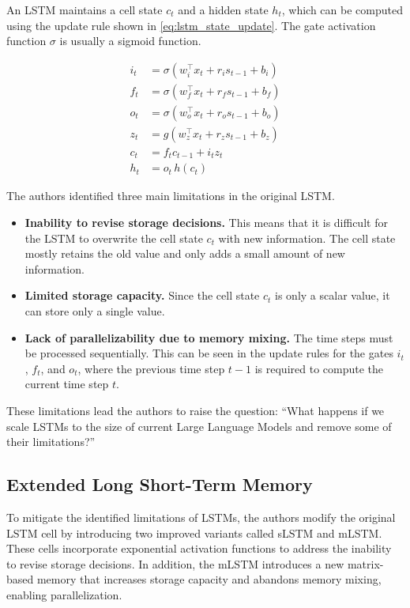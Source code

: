 \documentclass[a4paper,oneside,10pt,ngerman,english]{scrartcl}
\begin{document}
An LSTM maintains a cell state $c_t$ and a hidden state $h_t$, which can be computed using the update rule shown in \autoref{eq:lstm_state_update}. The gate activation function $\sigma$ is usually a sigmoid function.

\begin{align}
	i_t &= \sigma \left( w_i^{\top} x_t + r_i s_{t-1} + b_i \right) \\
	f_t &= \sigma \left( w_f^{\top} x_t + r_f s_{t-1} + b_f \right) \\
	o_t &= \sigma \left( w_o^{\top} x_t + r_o s_{t-1} + b_o \right) \\
	z_t &= g \left( w_z^{\top} x_t + r_z s_{t-1} + b_z \right) \\
	c_t &= f_t c_{t-1} + i_t z_t \\
	h_t &= o_t \, h(c_t)
	\label{eq:lstm_state_update}
\end{align}

The authors identified three main limitations in the original LSTM.
\begin{itemize}
	\item \textbf{Inability to revise storage decisions.} This means that it is difficult for the LSTM to overwrite the cell state $c_t$ with new information. The cell state mostly retains the old value and only adds a small amount of new information.
	\item \textbf{Limited storage capacity.} Since the cell state $c_t$ is only a scalar value, it can store only a single value.
	\item \textbf{Lack of parallelizability due to memory mixing.} The time steps must be processed sequentially. This can be seen in the update rules for the gates $i_t$, $f_t$, and $o_t$, where the previous time step $t-1$ is required to compute the current time step $t$.
\end{itemize}

These limitations lead the authors to raise the question: “What happens if we scale LSTMs to the size of current Large Language Models and remove some of their limitations?”

\subsection{Extended Long Short-Term Memory}
\label{sec:xlstm}

To mitigate the identified limitations of LSTMs, the authors modify the original LSTM cell by introducing two improved variants called sLSTM and mLSTM. These cells incorporate exponential activation functions to address the inability to revise storage decisions. In addition, the mLSTM introduces a new matrix-based memory that increases storage capacity and abandons memory mixing, enabling parallelization.
\end{document}
